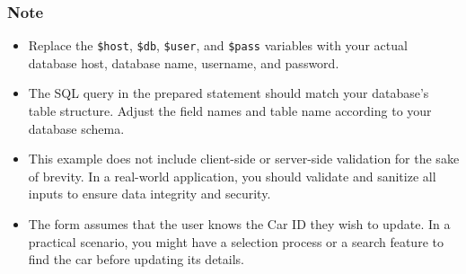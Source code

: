 \documentclass[11pt]{article}
\begin{document}
\subsubsection{Note}
\label{sec:org959a493}
\begin{itemize}
\item Replace the \texttt{\$host}, \texttt{\$db}, \texttt{\$user}, and \texttt{\$pass} variables with your
actual database host, database name, username, and password.
\item The SQL query in the prepared statement should match your database's
table structure. Adjust the field names and table name according to
your database schema.
\item This example does not include client-side or server-side validation
for the sake of brevity. In a real-world application, you should
validate and sanitize all inputs to ensure data integrity and
security.
\item The form assumes that the user knows the Car ID they wish to update.
In a practical scenario, you might have a selection process or a
search feature to find the car before updating its details.
\end{itemize}
\end{document}
